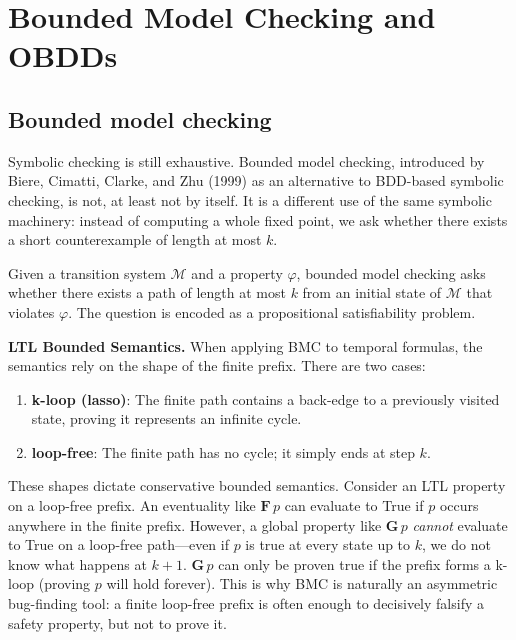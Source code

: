 \section{Bounded Model Checking and OBDDs}
\label{sec:bmc-obdd}

\subsection{Bounded model checking}

Symbolic checking is still exhaustive.  Bounded model checking, introduced
by Biere, Cimatti, Clarke, and Zhu (1999) as an alternative to BDD-based
symbolic checking, is not, at least not by itself.  It is a different use of
the same symbolic machinery:
instead of computing a whole fixed point, we ask whether there exists a short
counterexample of length at most $k$.

\begin{definition}
Given a transition system $\mathcal{M}$ and a property $\varphi$, bounded
model checking asks whether there exists a path of length at most $k$ from an
initial state of $\mathcal{M}$ that violates $\varphi$.  The question is
encoded as a propositional satisfiability problem.
\end{definition}

\medskip\noindent
\textbf{LTL Bounded Semantics.} When applying BMC to temporal formulas, the semantics rely on the shape of the finite prefix. There are two cases:
\begin{enumerate}
    \item \textbf{k-loop (lasso)}: The finite path contains a back-edge to a previously visited state, proving it represents an infinite cycle.
    \item \textbf{loop-free}: The finite path has no cycle; it simply ends at step $k$.
\end{enumerate}

These shapes dictate conservative bounded semantics. Consider an LTL property on a loop-free prefix. 
An eventuality like $\mathbf{F}\,p$ can evaluate to True if $p$ occurs anywhere in the finite prefix. However, a global property like $\mathbf{G}\,p$ \emph{cannot} evaluate to True on a loop-free path—even if $p$ is true at every state up to $k$, we do not know what happens at $k+1$. $\mathbf{G}\,p$ can only be proven true if the prefix forms a k-loop (proving $p$ will hold forever). This is why BMC is naturally an asymmetric bug-finding tool: a finite loop-free prefix is often enough to decisively falsify a safety property, but not to prove it.

